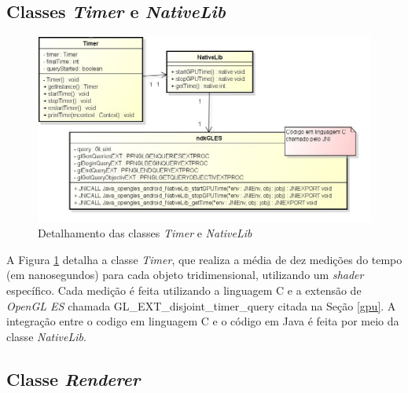\subsection{Classes \textit{Timer} e \textit{NativeLib}}      

	\begin{figure}[h]
	\centering
		\includegraphics[keepaspectratio=true,scale=0.6]{figuras/timer_nativelib.jpg}
	\caption{Detalhamento das classes \textit{Timer} e \textit{NativeLib}}
	\label{timer_nativelib}
	\end{figure}

	A Figura \ref{timer_nativelib} detalha a classe \textit{Timer}, que realiza a média de dez medições do tempo (em nanosegundos) para cada objeto tridimensional, utilizando um \textit{shader} específico. Cada medição é feita utilizando a linguagem C e a extensão de \textit{OpenGL ES} chamada GL\_EXT\_disjoint\_timer\_query citada na Seção \ref{gpu}.  A integração entre o codigo em linguagem C e o código em Java é feita por meio da classe \textit{NativeLib}.

\subsection{Classe \textit{Renderer}}    


